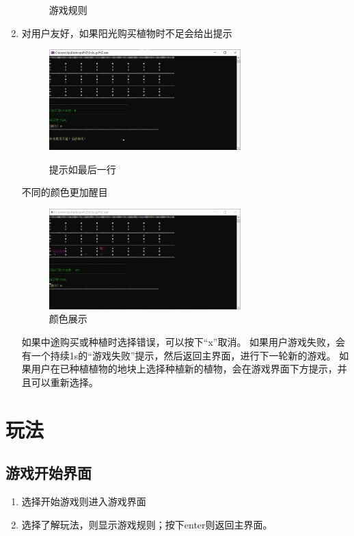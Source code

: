 \documentclass[12pt,a4paper,UTF8]{article}
\begin{document}
\begin{enumerate}
\begin{figure}[H]
  \caption{游戏规则}
  \end{figure}
  \item 对用户友好，如果阳光购买植物时不足会给出提示
  \begin{figure}[H]
    \centering
  \includegraphics[width=0.7\textwidth]{figure/cout.png}\\
  \caption{提示如最后一行}
  \end{figure}
  不同的颜色更加醒目
  \begin{figure}[H]
    \centering
  \includegraphics[width=0.7\textwidth]{figure/color.png}
  \caption{颜色展示}
  \end{figure}
  如果中途购买或种植时选择错误，可以按下“x”取消。
  如果用户游戏失败，会有一个持续1s的“游戏失败”提示，然后返回主界面，进行下一轮新的游戏。
  如果用户在已种植植物的地块上选择种植新的植物，会在游戏界面下方提示，并且可以重新选择。
\end{enumerate}
      
    
  
\section{玩法}
  \subsection{游戏开始界面}
  \begin{enumerate}
    \item 选择开始游戏则进入游戏界面
    \item 选择了解玩法，则显示游戏规则；按下enter则返回主界面。
  \end{enumerate}
  
\end{document}
